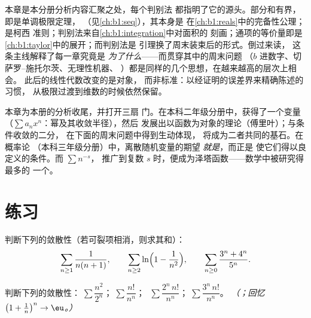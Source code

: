 \begin{remark}[回望分析学的主线]
本章是本分册分析内容汇聚之处，每个判别法
都指明了它的源头。部分和有界，即是单调极限定理，
（见\cref{ch:b1:seq}），其本身是
在\cref{ch:b1:reals}中的完备性公理；是柯西
准则；判别法来自\cref{ch:b1:integration}中对面积的
刻画；通项的等价量即是
\cref{ch:b1:taylor}中的展开；而判别法是
引理换了周末装束后的形式。倒过来读，
这条主线解释了每一章究竟是
\emph{为了什么}——而贯穿其中的周末问题
（$b$ 进数字、切萨罗–施托尔茨、无理性机器、
）都是同样的几个思想，在越来越高的层次上相会。
此后的线性代数改变的是对象，
而非标准：以经证明的误差界来精确陈述的习惯，
从极限过渡到维数的时候依然保留。
\end{remark}

\begin{remark}[级数的下一站]
本章为本册的分析收尾，并打开三扇
门。在本科二年级分册中，获得了一个变量（$\sum
a_n x^n$：幂及其收敛半径），然后
发展出以函数为对象的理论（傅里叶）；与条件收敛的二分，
在下面的周末问题中得到生动体现，
将成为二者共同的基石。在概率论
（本科三年级分册）中，离散随机变量的期望
\emph{就是}，而正是
使它们得以良定义的条件。而 $\sum n^{-s}$，
推广到复数 $s$ 时，便成为泽塔函数——数学中被研究得最多的
一个。
\end{remark}

\section{练习}

\begin{exercise}[$\star$]\label{exo:b1:series:1}
判断下列的敛散性（若可裂项相消，则求其和）：
\[
\sum_{n\geq1} \frac{1}{n(n+1)},
\qquad
\sum_{n\geq2} \ln\Bigl(1 - \frac{1}{n^2}\Bigr),
\qquad
\sum_{n\geq0} \frac{3^n + 4^n}{5^n} .
\]
\end{exercise}

\begin{exercise}[$\star$]\label{exo:b1:series:2}
判断下列的敛散性：$\;\sum \dfrac{n^2}{2^n}$；$\;\sum \dfrac{n!}{n^n}$；
$\;\sum \dfrac{2^n\,n!}{n^n}$；$\;\sum \dfrac{3^n\,n!}{n^n}$。
\emph{（；回忆 $\bigl(1 + \frac1n\bigr)^n \to \eu$。）}
\end{exercise}

